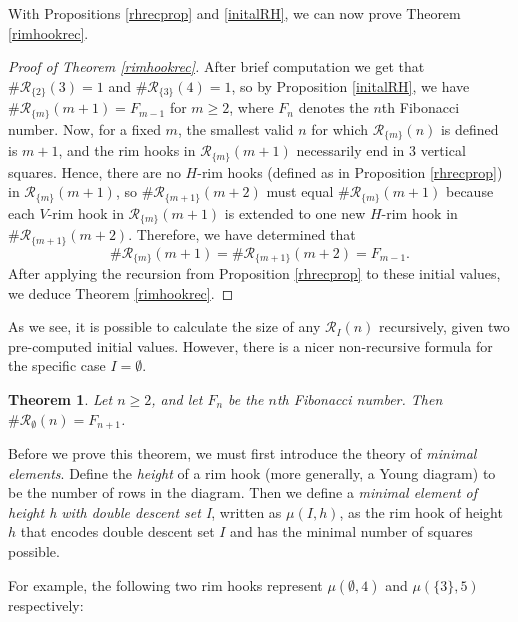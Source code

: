 \documentclass[11pt, a4paper, reqno]{article}
\numberwithin{equation}{section}
\newcommand{\ds}{\displaystyle}
\newtheorem{theorem}{Theorem}[section]
\theoremstyle{definition}
\begin{document}
	With Propositions \ref{rhrecprop} and \ref{initalRH}, we can now prove Theorem \ref{rimhookrec}.
	
	\begin{proof}[Proof of Theorem \ref{rimhookrec}] 
	    After brief computation we get that $\#\mathcal{R}_{\{2\}}(3) = 1$ and $\#\mathcal{R}_{\{3\}}(4) = 1$, so by Proposition \ref{initalRH}, we have $\#\mathcal{R}_{\{m\}}(m+1) = F_{m-1}$ for $m \geq 2$, where $F_n$ denotes the $n$th Fibonacci number. Now, for a fixed $m$, the smallest valid $n$ for which $\mathcal{R}_{\{m\}}(n)$ is defined is $m+1$, and the rim hooks in $\mathcal{R}_{\{m\}}(m+1)$ necessarily end in 3 vertical squares. Hence, there are no $H$-rim hooks (defined as in Proposition \ref{rhrecprop}) in $\mathcal{R}_{\{m\}}(m+1)$, so $\#\mathcal{R}_{\{m+1\}}(m+2)$ must equal $\#\mathcal{R}_{\{m\}}(m+1)$ because each $V$-rim hook in $\mathcal{R}_{\{m\}}(m+1)$ is extended to one new $H$-rim hook in $\#\mathcal{R}_{\{m+1\}}(m+2)$. Therefore, we have determined that $$\#\mathcal{R}_{\{m\}}(m+1) = \#\mathcal{R}_{\{m+1\}}(m+2) = F_{m-1}.$$
	    After applying the recursion from Proposition \ref{rhrecprop} to these initial values, we deduce Theorem \ref{rimhookrec}.
	\end{proof}
	
	 As we see, it is possible to calculate the size of any $\mathcal{R}_I(n)$ recursively, given two pre-computed initial values. However, there is a nicer non-recursive formula for the specific case $I = \emptyset$.
	
	\begin{theorem}\label{emptysetformula}
	Let $n \geq 2$, and let $F_n$ be the $n$th Fibonacci number. Then $\#\mathcal{R}_\emptyset(n) = \ds F_{n+1}$.
	\end{theorem}
	
	 Before we prove this theorem, we must first introduce the theory of \textit{minimal elements}. Define the \textit{height} of a rim hook (more generally, a Young diagram) to be the number of rows in the diagram. Then we define a \textit{minimal element of height h with double descent set I}, written as $\mu(I,h)$, as the rim hook of height $h$ that encodes double descent set $I$ and has the minimal number of squares possible. 
	
	For example, the following two rim hooks represent $\mu(\emptyset, 4)$ and $\mu(\{3\}, 5)$ respectively:
	
	\begin{center}
	         \hspace{1cm}  \hspace{1cm}
	\end{center}
	
\end{document}
